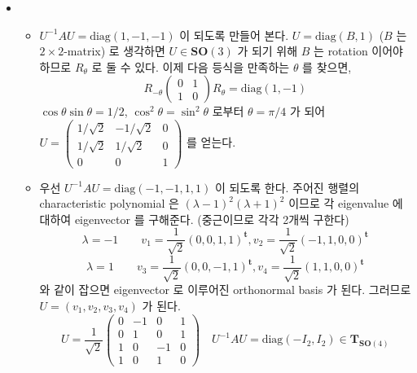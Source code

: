 \documentclass[12pt]{report}
\newcommand{\numl}[1]{\item[\large\textbf{\sffamily #1}]}
\newcommand{\num}[1]{\item[\textbf{\sffamily #1}]}
\newcommand{\rmbf}[1]{\mathrm{\mathbf{#1}}}
\newcommand{\trans}{^{\mathrm{\mathbf{t}}}}
\newcommand{\inv}{^{-1}}
\newcommand{\diag}{\text{diag}}
\renewcommand{\inv}{^{-1}}
\newcommand{\mat}[4]{\begin{pmatrix}#1 & #2 \\ #3 & #4\end{pmatrix}}
\begin{document}
\begin{itemize}
\numl{15.4.8}
	\begin{itemize}
		\num{(가)} $U\inv A U = \diag(1, -1, -1)$ 이 되도록 만들어 본다. $U = \diag(B, 1)$ ($B$ 는 $2\times 2$-matrix) 로 생각하면 $U\in \rmbf{SO}(3)$ 가 되기 위해 $B$ 는 rotation 이어야 하므로 $R_\theta$ 로 둘 수 있다. 이제 다음 등식을 만족하는 $\theta$ 를 찾으면,
		$$R_{-\theta}\mat{0}{1}{1}{0}R_\theta = \diag(1, -1) $$
		$\cos\theta \sin\theta = 1/2$, $\cos^2\theta = \sin^2\theta$ 로부터 $\theta = \pi/4$ 가 되어 $U=\begin{pmatrix}
		1/\sqrt{2} & -1/\sqrt{2} & 0 \\ 1/\sqrt{2} & 1/\sqrt{2} & 0 \\ 0 & 0 & 1
		\end{pmatrix}$ 를 얻는다.
		\num{(나)} 우선 $U\inv A U = \diag(-1, -1, 1, 1)$ 이 되도록 한다. 주어진 행렬의 characteristic polynomial 은 $(\lambda-1)^2(\lambda+1)^2$ 이므로 각 eigenvalue 에 대하여 eigenvector 를 구해준다. (중근이므로 각각 2개씩 구한다) $$\lambda = -1 \qquad v_1 = \frac{1}{\sqrt{2}}(0, 0, 1, 1)\trans, v_2 = \frac{1}{\sqrt{2}}(-1, 1, 0, 0)\trans$$
		$$\lambda = 1 \qquad v_3 = \frac{1}{\sqrt{2}}(0, 0, -1, 1)\trans, v_4 = \frac{1}{\sqrt{2}}(1, 1, 0, 0)\trans$$ 
		와 같이 잡으면 eigenvector 로 이루어진 orthonormal basis 가 된다. 그러므로 $U = (v_1, v_2, v_3, v_4)$ 가 된다.
		$$U = \frac{1}{\sqrt{2}}\begin{pmatrix}
			0 & -1 & 0 & 1 \\ 0 & 1 & 0 & 1 \\ 1 & 0 & -1 & 0 \\1 & 0 & 1 & 0
		\end{pmatrix}\quad U^{-1}AU = \diag(-I_2, I_2) \in \rmbf{T}_{\rmbf{SO}(4)}$$
		
	\end{itemize}  
\end{itemize}
\end{document}
